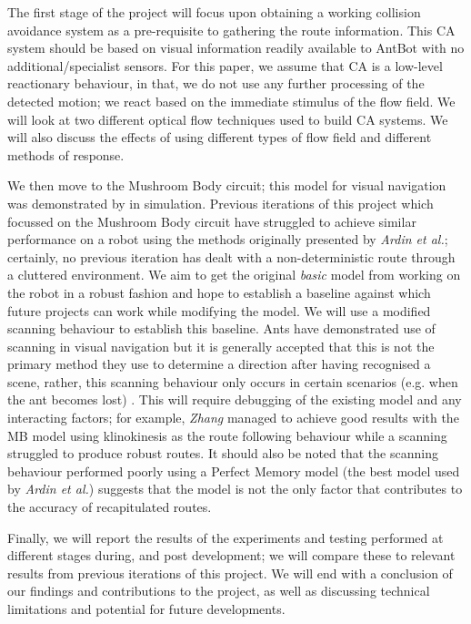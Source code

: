 \documentclass[a4paper,11pt,twoside,openright]{article}
\begin{document}
The first stage of the project will focus upon obtaining a working collision avoidance system as a
pre-requisite to gathering the route information. This CA system should be based on visual
information readily available to AntBot with no additional/specialist sensors. For this paper, we
assume that CA is a low-level reactionary behaviour, in that, we do not use any further processing
of the detected motion; we react based on the immediate stimulus of the flow
field. We will look at two different optical flow techniques used to build CA systems. We will also
discuss the effects of using different types of flow field and different methods of response.
\newline

We then move to the Mushroom Body circuit; this model for visual navigation was demonstrated by
\cite{Ardin2016} in simulation. Previous iterations of this project which focussed on the Mushroom
Body circuit have struggled to achieve similar performance on a robot using the methods originally
presented by \textit{Ardin et al.}; certainly, no previous iteration
has dealt with a non-deterministic route through a cluttered environment. We aim to get the original
\textit{basic} model from \cite{Ardin2016} working on the robot in a robust fashion and hope to
establish a baseline against which future projects can work while modifying the model. We will use
a modified scanning behaviour to establish this baseline. Ants have demonstrated use of scanning in
visual navigation but it is generally accepted that this
is not the primary method they use to determine a direction after having recognised a scene, rather,
this scanning behaviour only occurs in certain scenarios (e.g. when the ant becomes lost)
\cite{Kodzhabashev2015}. This will require debugging of the existing model and any interacting
factors; for example, \textit{Zhang} managed to achieve good results with the MB model using
klinokinesis as the route following behaviour while a scanning struggled to produce robust routes.
It should also be noted that the scanning behaviour performed poorly using a Perfect Memory model \cite{Zhang2017}
(the best model used by \textit{Ardin et al.}) suggests that the model is
not the only factor that contributes to the accuracy of recapitulated routes.
\newline

Finally, we will report the results of the experiments and testing performed at different stages during, and
post development; we will compare these to relevant results from previous iterations of
this project. We will end with a conclusion of our findings and contributions to the project,
as well as discussing technical limitations and potential for future developments.
\newpage
\end{document}
